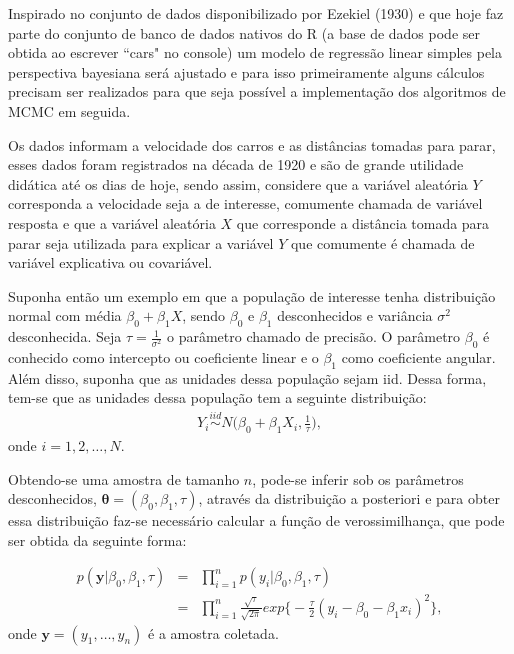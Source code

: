 \documentclass[12pt,a4paper,header]{abnt}
\def\bs{\boldsymbol}
\begin{document}
Inspirado no conjunto de dados disponibilizado por Ezekiel (1930)\cite{Ezekiel.cars} e que hoje faz parte do conjunto de banco de dados nativos do R \cite{R} (a base de dados pode ser obtida ao escrever ``cars" no console) um modelo de regressão linear simples pela perspectiva bayesiana será ajustado e para isso primeiramente alguns cálculos precisam ser realizados para que seja possível a implementação dos algoritmos de \ac{MCMC} em seguida.

Os dados informam a velocidade dos carros e as distâncias tomadas para parar, esses dados foram registrados na década de 1920 e são de grande utilidade didática até os dias de hoje, sendo assim, considere que a variável aleatória $Y$ corresponda a velocidade seja a de interesse, comumente chamada de variável resposta e que a variável aleatória $X$ que corresponde a distância tomada para parar seja utilizada para explicar a variável $Y$ que comumente é chamada de variável explicativa ou covariável.

Suponha então um exemplo em que a população de interesse tenha distribuição normal com média $\beta_0 + \beta_1 X$, sendo $\beta_0$ e $\beta_1$ desconhecidos e variância $\sigma^2$ desconhecida. Seja $\tau=\frac{1}{\sigma^2}$ o parâmetro chamado de precisão. O parâmetro $\beta_0$ é conhecido como intercepto ou coeficiente linear e o $\beta_1$ como coeficiente angular. Além disso, suponha que as unidades dessa população sejam \ac{iid}. Dessa forma, tem-se que as unidades dessa população tem a seguinte distribuição:
\begin{eqnarray}
Y_i \stackrel{iid}{\sim} N\Big(\beta_0 + \beta_1 X_i,\frac{1}{\tau}\Big),   \label{Met::modlinear}
\end{eqnarray}
onde $i=1,2,\ldots,N$.

Obtendo-se uma amostra de tamanho $n$, pode-se inferir sob os parâmetros desconhecidos, $\bs{\theta} = (\beta_0, \beta_1, \tau)$, através da distribuição a posteriori e para obter essa distribuição faz-se necessário calcular a função de verossimilhança, que pode ser obtida da seguinte forma:

\begin{eqnarray}
p(\bs{y}| \beta_0, \beta_1 , \tau) &=&\prod^n_{i=1} p(y_i | \beta_0, \beta_1, \tau ) \nonumber \\
%
 &=& \prod_{i=1}^n \frac{ \sqrt{\tau} }{ \sqrt{2\pi} } exp \Big\{ - \frac{\tau}{2} ( y_i - \beta_0 - \beta_1 x_i )^2 \Big\} , \label{Met::modlinearposteriori}
\end{eqnarray}
onde $\bs{y} = (y_1, \ldots, y_n)$ é a amostra coletada.
\end{document}
